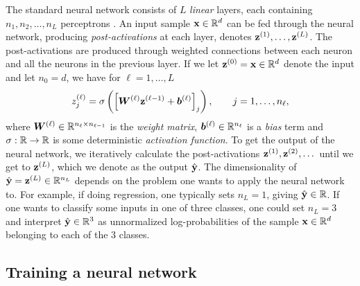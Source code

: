 \documentclass{statsmsc}
\begin{document}
{The standard neural network consists of $L$ \textit{linear} layers, each containing
$n_1,n_2,\dots,n_L$ perceptrons \citep{dnn}. An input sample $\mathbf{x} \in \mathbb{R}^d$ can be fed
through the neural network, producing \textit{post-activations} at each layer, denotes
$\mathbf{z}^{(1)}, \dots, \mathbf{z}^{(L)}$. The post-activations are produced through weighted
connections between each neuron and all the neurons in the previous layer. If we let
$\mathbf{z}^{(0)}=\mathbf{x} \in \mathbb{R}^d$ denote the input and let $n_0=d$, we have for $\ell=1,\dots,L$
\begin{equation}\label{eq:nn_update}
    z_j^{(\ell)} = \sigma \left(\left[ \boldsymbol{W}^{(\ell)} \mathbf{z}^{(\ell-1)} + \boldsymbol{b}^{(\ell)} \right]_j \right),\qquad j=1,\dots,n_\ell,
\end{equation}
where $\boldsymbol{W}^{(\ell)} \in \mathbb{R}^{n_{\ell} \times n_{\ell-1}}$ is the \textit{weight matrix},
$\boldsymbol{b}^{(\ell)} \in \mathbb{R}^{n_{\ell}}$ is a \textit{bias} term and
$\sigma : \mathbb{R} \rightarrow {\mathbb{R}}$ is some deterministic \textit{activation function}.
To get the output of the neural network, we iteratively calculate the post-activations
$\mathbf{z}^{(1)},\mathbf{z}^{(2)},\dots$ until we get to $\mathbf{z}^{(L)}$, which we denote as the output
$\hat{\mathbf{y}}$. The dimensionality of $\hat{\mathbf{y}}=\mathbf{z}^{(L)} \in \mathbb{R}^{n_L}$
depends on the problem one wants
to apply the neural network to. For example, if doing regression, one typically sets
$n_L=1$, giving $\hat{\mathbf{y}} \in \mathbb{R}$. If one wants to classify some inputs in one of three classes,
one could set $n_L=3$ and interpret $\hat{\mathbf{y}} \in \mathbb{R}^3$ as unnormalized log-probabilities of
the sample $\mathbf{x} \in \mathbb{R}^d$ belonging to each of the 3 classes.

\subsection{Training a neural network}%
\label{sub:Training a neural network}

}
\end{document}
